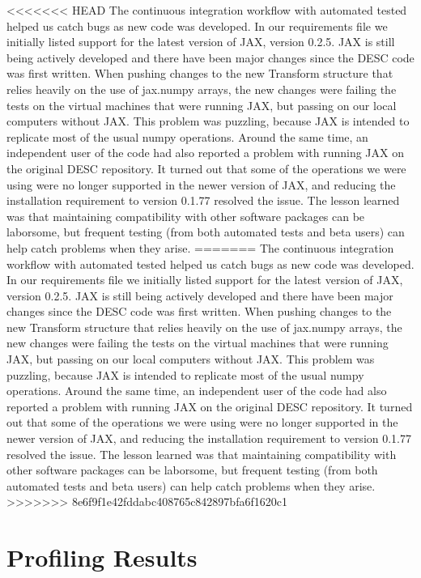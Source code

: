 \documentclass{article}
\begin{document}
<<<<<<< HEAD
The continuous integration workflow with automated tested helped us catch bugs as new code was developed.
In our requirements file we initially listed support for the latest version of JAX, version 0.2.5.
JAX is still being actively developed and there have been major changes since the DESC code was first written.
When pushing changes to the new Transform structure that relies heavily on the use of jax.numpy arrays, the new changes were failing the tests on the virtual machines that were running JAX, but passing on our local computers without JAX.
This problem was puzzling, because JAX is intended to replicate most of the usual numpy operations.
Around the same time, an independent user of the code had also reported a problem with running JAX on the original DESC repository.
It turned out that some of the operations we were using were no longer supported in the newer version of JAX, and reducing the installation requirement to version 0.1.77 resolved the issue.
The lesson learned was that maintaining compatibility with other software packages can be laborsome, but frequent testing (from both automated tests and beta users) can help catch problems when they arise.
=======
The continuous integration workflow with automated tested helped us catch bugs as new code was developed.
In our requirements file we initially listed support for the latest version of JAX, version 0.2.5.
JAX is still being actively developed and there have been major changes since the DESC code was first written.
When pushing changes to the new Transform structure that relies heavily on the use of jax.numpy arrays, the new changes were failing the tests on the virtual machines that were running JAX, but passing on our local computers without JAX.
This problem was puzzling, because JAX is intended to replicate most of the usual numpy operations.
Around the same time, an independent user of the code had also reported a problem with running JAX on the original DESC repository.
It turned out that some of the operations we were using were no longer supported in the newer version of JAX, and reducing the installation requirement to version 0.1.77 resolved the issue.
The lesson learned was that maintaining compatibility with other software packages can be laborsome, but frequent testing (from both automated tests and beta users) can help catch problems when they arise.
>>>>>>> 8e6f9f1e42fddabc408765c842897bfa6f1620c1

\section{Profiling Results}
\end{document}
